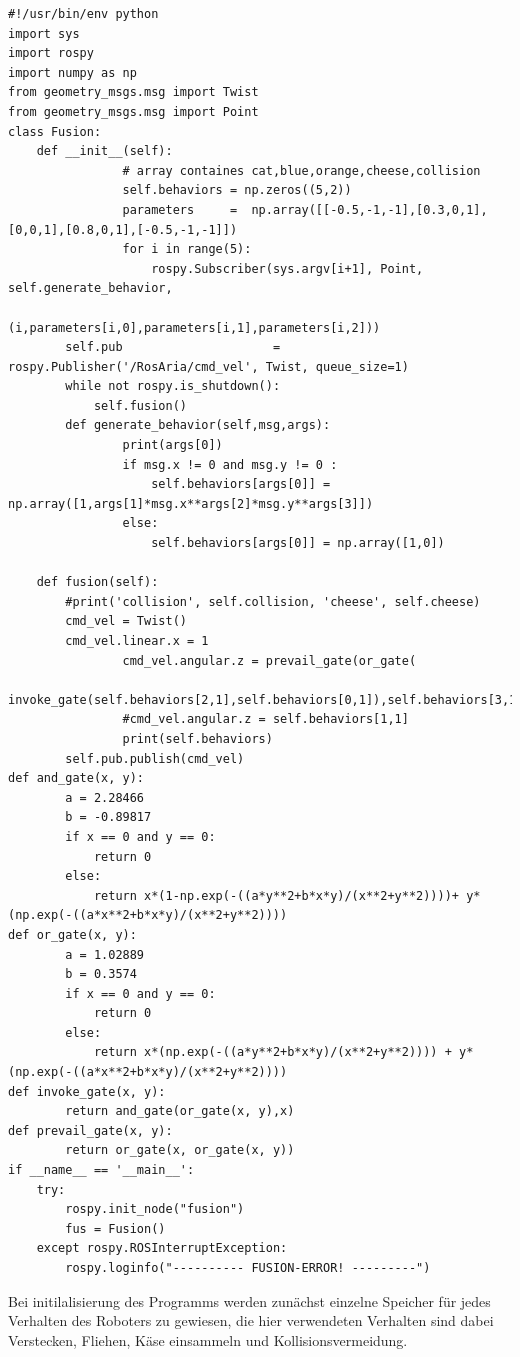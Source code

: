 \documentclass[11pt,a4paper]{article}
\begin{document}
\begin{tiny}
\begin{linenumbers}
\begin{lstlisting}
#!/usr/bin/env python
import sys
import rospy
import numpy as np
from geometry_msgs.msg import Twist
from geometry_msgs.msg import Point
class Fusion:
	def __init__(self):
                # array containes cat,blue,orange,cheese,collision
                self.behaviors = np.zeros((5,2))
                parameters     =  np.array([[-0.5,-1,-1],[0.3,0,1],[0,0,1],[0.8,0,1],[-0.5,-1,-1]])
                for i in range(5):
                    rospy.Subscriber(sys.argv[i+1], Point, self.generate_behavior,
                    (i,parameters[i,0],parameters[i,1],parameters[i,2]))
		self.pub                     = rospy.Publisher('/RosAria/cmd_vel', Twist, queue_size=1)
		while not rospy.is_shutdown():
			self.fusion()
        def generate_behavior(self,msg,args):
                print(args[0])
                if msg.x != 0 and msg.y != 0 :
                    self.behaviors[args[0]] = np.array([1,args[1]*msg.x**args[2]*msg.y**args[3]])
                else:
                    self.behaviors[args[0]] = np.array([1,0])

	def fusion(self):
		#print('collision', self.collision, 'cheese', self.cheese)
		cmd_vel = Twist()
		cmd_vel.linear.x = 1
                cmd_vel.angular.z = prevail_gate(or_gate(
                invoke_gate(self.behaviors[2,1],self.behaviors[0,1]),self.behaviors[3,1]),self.behaviors[4,1])
                #cmd_vel.angular.z = self.behaviors[1,1]
                print(self.behaviors)
		self.pub.publish(cmd_vel)
def and_gate(x, y):
        a = 2.28466
        b = -0.89817
        if x == 0 and y == 0:
            return 0
        else:
            return x*(1-np.exp(-((a*y**2+b*x*y)/(x**2+y**2))))+ y*(np.exp(-((a*x**2+b*x*y)/(x**2+y**2))))
def or_gate(x, y):
        a = 1.02889
        b = 0.3574
        if x == 0 and y == 0:
            return 0
        else:
            return x*(np.exp(-((a*y**2+b*x*y)/(x**2+y**2)))) + y*(np.exp(-((a*x**2+b*x*y)/(x**2+y**2))))
def invoke_gate(x, y):
        return and_gate(or_gate(x, y),x)
def prevail_gate(x, y):
        return or_gate(x, or_gate(x, y))
if __name__ == '__main__':
	try:
		rospy.init_node("fusion")
		fus = Fusion()	
	except rospy.ROSInterruptException:
		rospy.loginfo("---------- FUSION-ERROR! ---------")
\end{lstlisting}
\end{linenumbers}
\end{tiny}
Bei initilalisierung des Programms werden zunächst einzelne Speicher für jedes Verhalten des Roboters zu gewiesen, die hier verwendeten Verhalten sind dabei Verstecken, Fliehen, Käse einsammeln und Kollisionsvermeidung.
\end{document}
